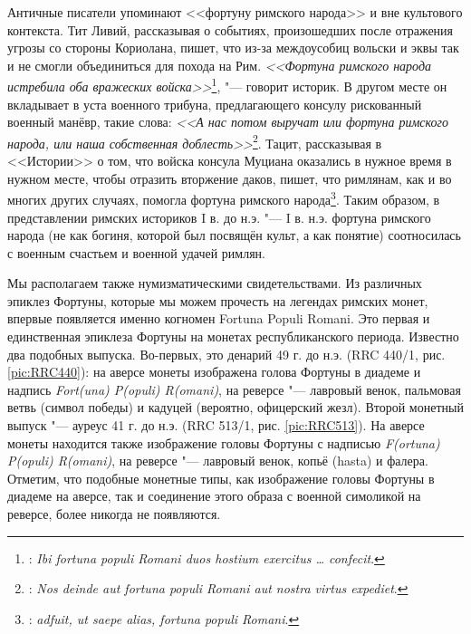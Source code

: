Античные писатели упоминают <<фортуну римского народа>> и вне культового контекста. Тит Ливий, рассказывая о событиях, произошедших после отражения угрозы со стороны Кориолана, пишет, что из-за междоусобиц вольски и эквы так и не смогли объединиться для похода на Рим. \textit{<<Фортуна римского народа истребила оба вражеских войска>>}\footnote{: \textit{Ibi fortuna populi Romani duos hostium exercitus \ldots{} confecit}.}, "--- говорит историк. В другом месте он вкладывает в уста военного трибуна, предлагающего консулу рискованный военный манёвр, такие слова: \textit{<<А нас потом выручат или фортуна римского народа, или наша собственная доблесть>>}\footnote{: \textit{Nos deinde aut fortuna populi Romani aut nostra virtus expediet}.}. Тацит, рассказывая в <<Истории>> о том, что войска консула Муциана оказались в нужное время в нужном месте, чтобы отразить вторжение даков, пишет, что римлянам, как и во многих других случаях, помогла фортуна римского народа\footnote{: \textit{adfuit, ut saepe alias, fortuna populi Romani}.}. Таким образом, в представлении римских историков I в. до н.э. "--- I в. н.э. фортуна римского народа (не как богиня, которой был посвящён культ, а как понятие) соотносилась с военным счастьем и военной удачей римлян.


Мы располагаем также нумизматическими свидетельствами. Из различных эпиклез Фортуны, которые мы можем прочесть на легендах римских монет, впервые появляется именно когномен Fortuna Populi Romani. Это первая и единственная эпиклеза Фортуны на монетах республиканского периода. Известно два подобных выпуска. Во-первых, это денарий 49 г. до н.э. (RRC 440/1, рис. \ref{pic:RRC440}): на аверсе монеты изображена голова Фортуны в диадеме и надпись \textit{Fort(una) P(opuli) R(omani)}, на реверсе "--- лавровый венок, пальмовая ветвь (символ победы) и кадуцей (вероятно, офицерский жезл). Второй монетный выпуск "--- ауреус 41 г. до н.э. (RRC 513/1, рис. \ref{pic:RRC513}). На аверсе монеты находится также изображение головы Фортуны с надписью \textit{F(ortuna) P(opuli) R(omani)}, на реверсе "--- лавровый венок, копьё (hasta) и фалера. Отметим, что подобные монетные типы, как изображение головы Фортуны в диадеме на аверсе, так и соединение этого образа с военной симоликой на реверсе, более никогда не появляются.

